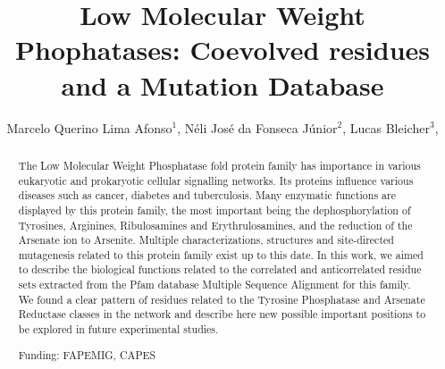 \documentclass[twoside]{article}
\title{\vspace{-15mm}\fontsize{24pt}{10pt}\selectfont\textbf{ Low Molecular Weight Phophatases: Coevolved residues and a Mutation Database }} %
\author{ Marcelo Querino Lima Afonso$^{1}$, Néli José da Fonseca Júnior$^{2}$, Lucas Bleicher$^{3}$, }
\affil{ 1 UFMG

2 Universidade Federal de Minas Gerais

3 Federal University of Minas Gerais

 }
\date{}
\begin{document}
  
  
  \maketitle %
  
  
  \thispagestyle{fancy} %
  
  
  \begin{abstract}
  The Low Molecular Weight Phosphatase fold protein family has importance
in various eukaryotic and prokaryotic cellular signalling networks.
Its proteins influence various diseases such as cancer, diabetes and tuberculosis.
Many enzymatic functions are displayed by this protein family, the most important being the dephosphorylation of Tyrosines, Arginines, Ribulosamines
and Erythrulosamines, and the reduction of the Arsenate ion to Arsenite.
Multiple characterizations, structures and site-directed mutagenesis related to this protein family exist up to this date. In this work, we aimed to
describe the biological functions related to the correlated and anticorrelated residue
sets extracted from the Pfam database Multiple Sequence Alignment for this family.
We found a clear pattern of residues related to the Tyrosine Phosphatase and Arsenate Reductase classes in the network and describe here new
possible important positions to be explored in future experimental studies.
  
  Funding: FAPEMIG, CAPES \\ 
  \end{abstract}
  
\end{document}
